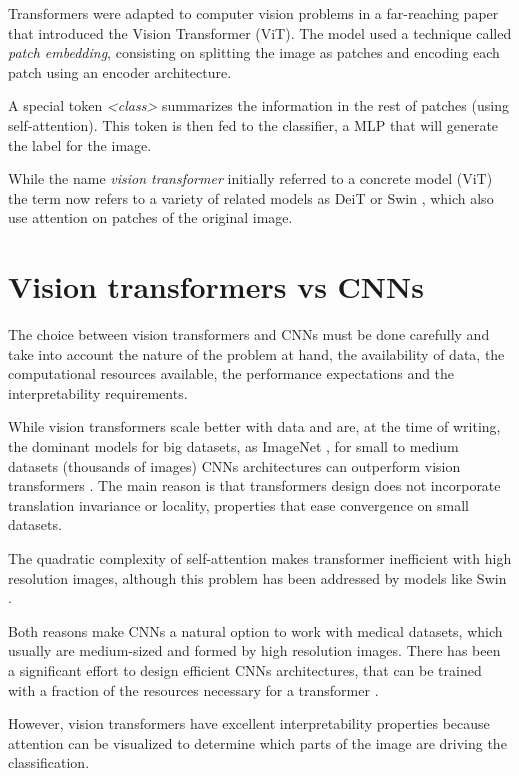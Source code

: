 Transformers were adapted to computer vision problems in a far-reaching paper that introduced the Vision Transformer (ViT)\cite{dosovitskiy2020image}. The model used a technique called \textit{patch embedding}, consisting on splitting the image as patches and encoding each patch using an encoder architecture. 

A special token \textit{<class>} summarizes the information in the rest of patches (using self-attention). This token is then fed to the classifier, a MLP that will generate the label for the image. 

While the name \textit{vision transformer} initially referred to a concrete model (ViT) the term now refers to a variety of related models as DeiT \cite{pmlr-v139-touvron21a} or Swin \cite{liu2021swin}, which also use attention on patches of the original image.

\section{Vision transformers vs CNNs}
The choice between vision transformers and CNNs must be done carefully and take into account the nature of the problem at hand, the availability of data, the computational resources available, the performance expectations and the interpretability requirements.

While vision transformers scale better with data and are, at the time of writing, the dominant models for big datasets, as ImageNet \cite{imagenet}, for small to medium datasets (thousands of images) CNNs architectures can outperform vision transformers \cite{tan2021efficientnetv2}. The main reason is that transformers design does not incorporate translation invariance or locality, properties that ease convergence on small datasets.

The quadratic complexity of self-attention makes transformer inefficient with high resolution images, although this problem has been addressed by models like Swin \cite{liu2021swin}.

Both reasons make CNNs a natural option to work with medical datasets, which usually are medium-sized and formed by high resolution images. There has been a significant effort to design efficient CNNs architectures, that can be trained with a fraction of the resources necessary for a transformer \cite{tan2021efficientnetv2}.

However, vision transformers have excellent interpretability properties \cite{chefer2021transformer} because attention can be visualized to determine which parts of the image are driving the classification. 


